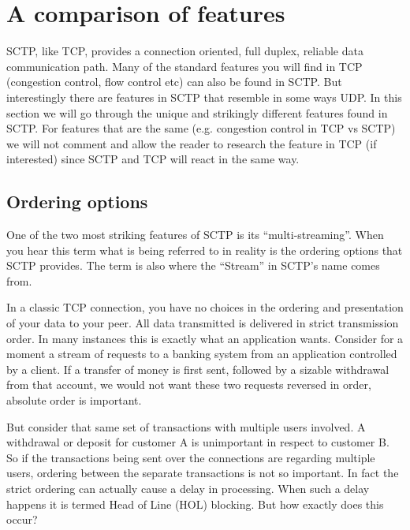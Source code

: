 \documentclass[conference]{IEEEtran}
\begin{document}
\section{A comparison of features}
SCTP, like TCP, provides a connection oriented, full duplex, reliable data communication path. Many
of the standard features you will find in TCP (congestion control, flow control etc) can also be found
in SCTP. But interestingly there are features in SCTP that resemble in some ways UDP. In this section we
will go through the unique and strikingly different features found in SCTP. For features that are the same
(e.g. congestion control in TCP vs SCTP) we will not comment and allow the reader to research the feature
in TCP (if interested) since SCTP and TCP will react in the same way.

\subsection{Ordering options}
\label{hol}
One of the two most striking features of SCTP is its ``multi-streaming''. When you hear
this term what is being referred to in reality is the ordering options that SCTP provides. The 
term is also where the ``Stream'' in SCTP's name comes from.

In a classic TCP connection, you have no choices in the ordering and presentation of your
data to your peer. All data transmitted is delivered in strict transmission order. In many
instances this is exactly what an application wants. Consider for a moment a stream of
requests to a banking system from an application controlled by a client. If a transfer of
money is first sent, followed by a sizable withdrawal from that account, we would not want
these two requests reversed in order, absolute order is important. 

But consider that same set of transactions with multiple users involved. A withdrawal or
deposit for customer A is unimportant in respect to customer B.  So if the transactions
being sent over the connections are regarding multiple users, ordering between the
separate transactions is not so important. In fact the strict ordering can actually cause
a delay in processing.  When such a delay happens it is termed Head of Line (HOL) blocking.
But how exactly does this occur?
\end{document}
